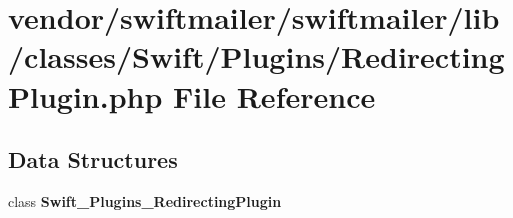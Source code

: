 \section{vendor/swiftmailer/swiftmailer/lib/classes/\+Swift/\+Plugins/\+Redirecting\+Plugin.php File Reference}
\label{_redirecting_plugin_8php}
\subsection*{Data Structures}
\begin{DoxyCompactItemize}
\item 
class {\bf Swift\+\_\+\+Plugins\+\_\+\+Redirecting\+Plugin}
\end{DoxyCompactItemize}
